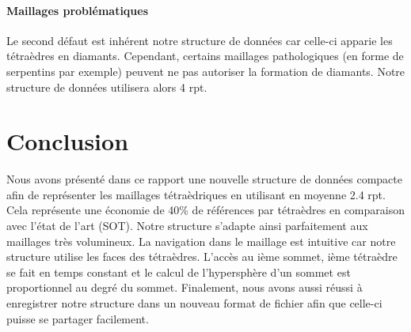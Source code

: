 \paragraph{Maillages problématiques}Le second défaut est inhérent notre structure de données car celle-ci apparie les tétraèdres en diamants. Cependant, certains maillages pathologiques (en forme de serpentins par exemple) peuvent ne pas autoriser la formation de diamants. Notre structure de données utilisera alors 4 rpt.

\section{Conclusion}
\noindent
Nous avons présenté dans ce rapport une nouvelle structure de données compacte afin de représenter les maillages tétraèdriques en utilisant en moyenne 2.4 rpt. Cela représente une économie de 40\% de références par tétraèdres en comparaison avec l'état de l'art (SOT). Notre structure s'adapte ainsi parfaitement aux maillages très volumineux. La navigation dans le maillage est intuitive car notre structure utilise les faces des tétraèdres. L'accès au ième sommet, ième tétraèdre se fait en temps constant et le calcul de l'hypersphère d'un sommet est proportionnel au degré du sommet. Finalement, nous avons aussi réussi à enregistrer notre structure dans un nouveau format de fichier afin que celle-ci puisse se partager facilement.